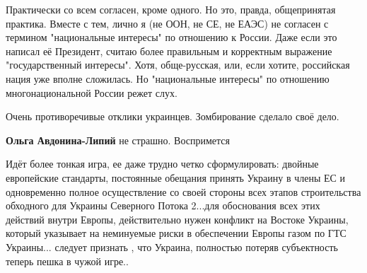 \begin{itemize}
Практически со всем согласен, кроме одного. Но это, правда, общепринятая
практика. Вместе с тем, лично я (не ООН, не СЕ, не ЕАЭС) не согласен с термином
"национальные интересы" по отношению к России. Даже если это написал её
Президент, считаю более правильным и корректным выражение "государственный
интересы". Хотя, обще-русская, или, если хотите, российская нация уже вполне
сложилась. Но "национальные интересы" по отношению многонациональной России
режет слух.


 

Очень противоречивые отклики украинцев. Зомбирование сделало своё дело.

\begin{itemize}
 
\textbf{Ольга Авдонина-Липий} не страшно. Воспримется
\end{itemize}

 

Идёт более тонкая игра, ее даже трудно четко сформулировать: двойные
европейские стандарты, постоянные обещания принять Украину в члены ЕС и
одновременно полное осуществление со своей стороны всех этапов строительства
обходного для Украины Северного Потока 2...для обоснования всех этих действий
внутри Европы, действительно нужен конфликт на Востоке Украины, который
указывает на неминуемые риски в обеспечении Европы газом по ГТС Украины...
следует признать , что Украина, полностью потеряв субъектность теперь пешка в
чужой игре..


 


\end{itemize}
